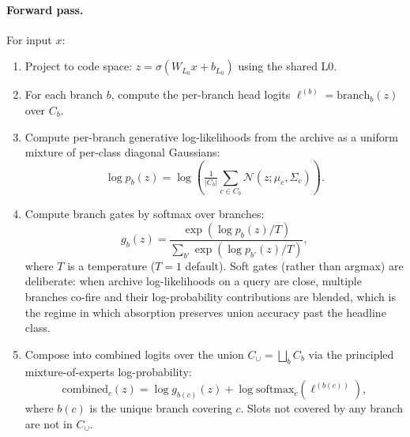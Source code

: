 \documentclass[11pt]{article}
\begin{document}
\paragraph{Forward pass.} For input $x$:
\begin{enumerate}[leftmargin=2em]
  \item Project to code space: $z = \sigma(W_{L_0} x + b_{L_0})$ using
        the shared L0.
  \item For each branch $b$, compute the per-branch head logits
        $\ell^{(b)} = \text{branch}_b(z)$ over $C_b$.
  \item Compute per-branch generative log-likelihoods from the archive
        as a uniform mixture of per-class diagonal Gaussians:
        $$\log p_b(z) = \log\!\left(\tfrac{1}{|C_b|} \sum_{c \in C_b} \mathcal{N}(z;\mu_c, \Sigma_c)\right).$$
  \item Compute branch gates by softmax over branches:
        $$g_b(z) = \frac{\exp(\log p_b(z) / T)}{\sum_{b'} \exp(\log p_{b'}(z) / T)},$$
        where $T$ is a temperature ($T = 1$ default). Soft gates
        (rather than argmax) are deliberate: when archive
        log-likelihoods on a query are close, multiple branches
        co-fire and their log-probability contributions are blended,
        which is the regime in which absorption preserves union
        accuracy past the headline class.
  \item Compose into combined logits over the union
        $C_{\cup} = \bigsqcup_b C_b$ via the principled mixture-of-experts
        log-probability:
        $$\text{combined}_c(z) = \log g_{b(c)}(z) + \log\text{softmax}_c(\ell^{(b(c))}),$$
        where $b(c)$ is the unique branch covering $c$. Slots not covered
        by any branch are not in $C_{\cup}$.
\end{enumerate}
\end{document}
